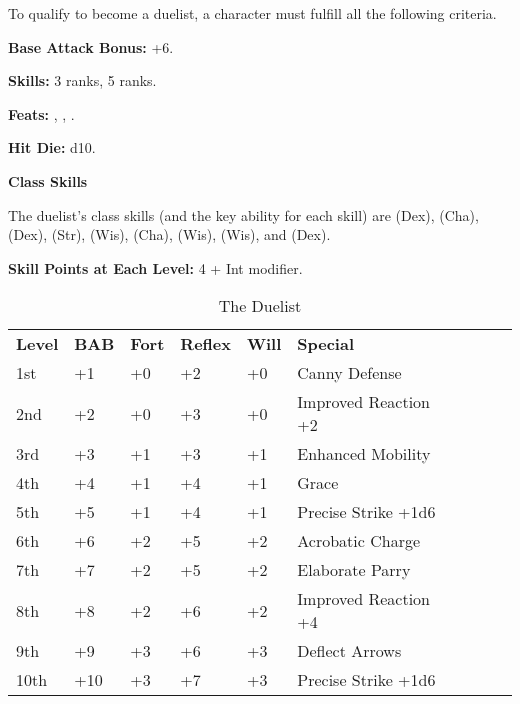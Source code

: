 
\Requirements

To qualify to become a duelist, a character must fulfill all the following criteria.

\textbf{Base Attack Bonus:} +6.

\textbf{Skills:}  3 ranks,  5 ranks.

\textbf{Feats:} , , .

\Basics

\textbf{Hit Die:} d10.

\textbf{Class Skills}

The duelist's class skills (and the key ability for each skill) are  (Dex), 
 (Cha),  (Dex),  (Str),  (Wis),  (Cha),
 (Wis),  (Wis), and  (Dex).

\textbf{Skill Points at Each Level:} 4 + Int modifier.

\begin{table}[htb]
\caption{The Duelist}
\centering
\begin{tabular}{*{6}{l}*{4}{c}}
\textbf{Level} & \textbf{BAB} & \textbf{Fort} & \textbf{Reflex} & \textbf{Will} & \textbf{Special}\\
1st & +1 & +0 & +2 & +0 & Canny Defense \\
2nd & +2 & +0 & +3 & +0 & Improved Reaction +2\\
3rd & +3 & +1 & +3 & +1 & Enhanced Mobility\\
4th & +4 & +1 & +4 & +1 & Grace\\
5th & +5 & +1 & +4 & +1 & Precise Strike +1d6\\
6th & +6 & +2 & +5 & +2 & Acrobatic Charge\\
7th & +7 & +2 & +5 & +2 & Elaborate Parry\\
8th & +8 & +2 & +6 & +2 & Improved Reaction +4\\
9th & +9 & +3 & +6 & +3 & Deflect Arrows\\
10th & +10 & +3 & +7 & +3 & Precise Strike +1d6\\
\end{tabular}
\end{table}

